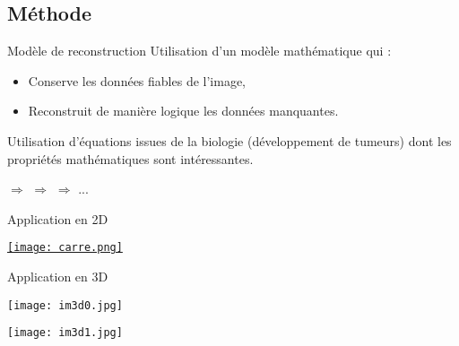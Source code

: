 \documentclass[11pt]{beamer}
\begin{document}
\subsection{Méthode}
\begin{frame}{Modèle de reconstruction}
Utilisation d'un modèle mathématique qui :

\begin{itemize}
\item Conserve les données fiables de l'image,
\item Reconstruit de manière logique les données manquantes.
\end{itemize}
\pause
\vspace{0.8cm}
Utilisation d'équations issues de la biologie (développement de tumeurs) dont les propriétés mathématiques sont intéressantes.

\pause
\vspace{0.8cm}
\begin{center}
 $\Rightarrow$  $\Rightarrow$  $\Rightarrow$ ...
\end{center}
\end{frame}

\begin{frame}
\begin{center}
Application en 2D
\end{center}
\end{frame}

\begin{frame}
\begin{center}
\href{run:ref7365716039_date29-Aug-2016_test4.avi}{\texttt{[image: carre.png]}}
\end{center}
\end{frame}

\begin{frame}
\begin{center}
Application en 3D
\end{center}
\end{frame}


\begin{frame}
\begin{center}
\texttt{[image: im3d0.jpg]}
\end{center}
\end{frame}

\begin{frame}
\begin{center}
\texttt{[image: im3d1.jpg]}
\end{center}
\end{frame}
\end{document}

